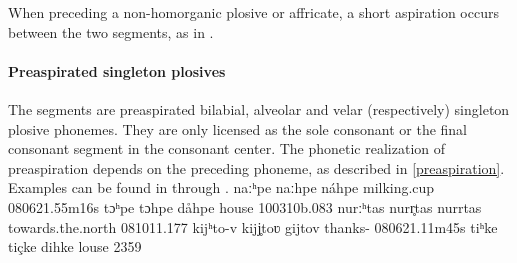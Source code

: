 When preceding a non-homorganic plosive or affricate, a short aspiration occurs between the two segments, as in . 



\paragraph{Preaspirated singleton plosives}
The segments \mbox{} are preaspirated bilabial, alveolar and velar (respectively) singleton plosive phonemes. They are only licensed as the sole consonant or the final consonant segment in the consonant center. 
The phonetic realization of preaspiration depends on the preceding phoneme, as described in \SEC\ref{preaspiration}. 
Examples can be found in  through . 
	{naː{ʰp}e}		{naː{hp}e}	{náhpe}	{milking.cup\BS{}}	{080621}{.55m16s}
		{tɔ{ʰp}e}		{tɔ{hp}e}		{dåhpe}	{house\BS{}}		{100310b}{.083}
		{nurː{ʰt}as}	{nur{r̥t}as}	{nurrtas}	{towards.the.north}		{081011}{.177}
		{kij{ʰt}o-v}		{kij{j̥t}oʋ}		{gijtov}	{thanks-}		{080621}{.11m45s}
		{ti{ʰk}e}		{ti{çk}e}		{dihke}	{louse\BS{}}		{2359}

